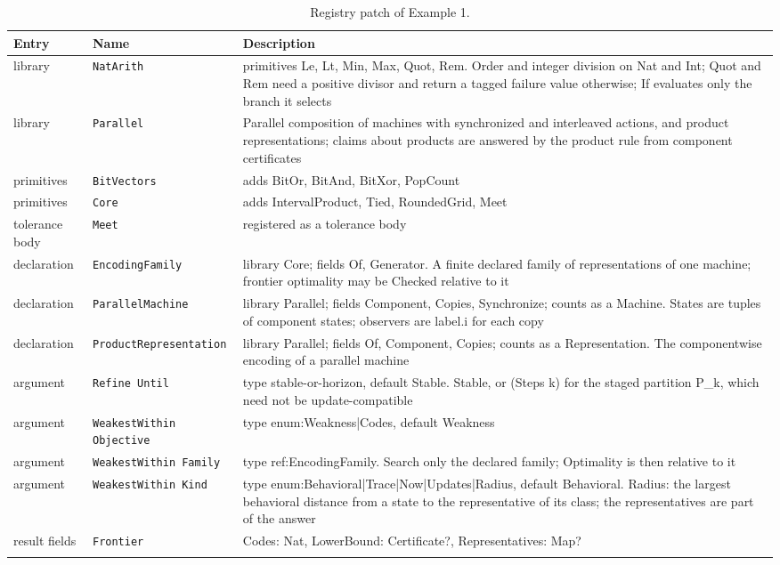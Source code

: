 \documentclass[11pt]{article}
\newcommand{\code}[1]{\texttt{#1}}
\theoremstyle{definition}
\theoremstyle{plain}
\begin{document}
\begin{footnotesize}
\begin{longtable}{>{\raggedright\arraybackslash}p{2.2cm}>{\raggedright\arraybackslash}p{4.1cm}>{\raggedright\arraybackslash}p{7.9cm}}
\toprule
Entry & Name & Description\\
\midrule
\endhead
library & \code{NatArith} & primitives Le, Lt, Min, Max, Quot, Rem. Order and integer division on Nat and Int; Quot and Rem need a positive divisor and return a tagged failure value otherwise; If evaluates only the branch it selects\\
library & \code{Parallel} & Parallel composition of machines with synchronized and interleaved actions, and product representations; claims about products are answered by the product rule from component certificates\\
primitives & \code{BitVectors} & adds BitOr, BitAnd, BitXor, PopCount\\
primitives & \code{Core} & adds IntervalProduct, Tied, RoundedGrid, Meet\\
tolerance body & \code{Meet} & registered as a tolerance body\\
declaration & \code{EncodingFamily} & library Core; fields Of, Generator. A finite declared family of representations of one machine; frontier optimality may be Checked relative to it\\
declaration & \code{ParallelMachine} & library Parallel; fields Component, Copies, Synchronize; counts as a Machine. States are tuples of component states; observers are label.i for each copy\\
declaration & \code{ProductRepresentation} & library Parallel; fields Of, Component, Copies; counts as a Representation. The componentwise encoding of a parallel machine\\
argument & \code{Refine Until} & type stable-or-horizon, default Stable. Stable, or (Steps k) for the staged partition P\_k, which need not be update-compatible\\
argument & \code{WeakestWithin Objective} & type enum:\allowbreak{}Weakness|\allowbreak{}Codes, default Weakness\\
argument & \code{WeakestWithin Family} & type ref:\allowbreak{}EncodingFamily. Search only the declared family; Optimality is then relative to it\\
argument & \code{WeakestWithin Kind} & type enum:\allowbreak{}Behavioral|\allowbreak{}Trace|\allowbreak{}Now|\allowbreak{}Updates|\allowbreak{}Radius, default Behavioral. Radius:\allowbreak{} the largest behavioral distance from a state to the representative of its class; the representatives are part of the answer\\
result fields & \code{Frontier} & Codes:\allowbreak{} Nat, LowerBound:\allowbreak{} Certificate?, Representatives:\allowbreak{} Map?\\
\bottomrule
\caption{Registry patch of Example 1.}
\end{longtable}
\end{footnotesize}
\end{document}
